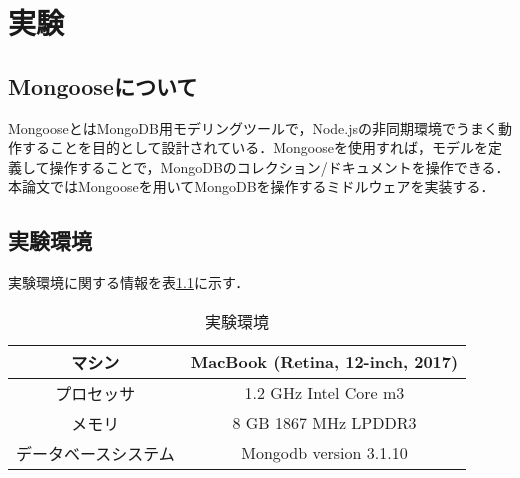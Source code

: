 \documentclass[a4paper,11pt]{ujreport}
\begin{document}
\chapter{実験}
\label{chap:Experiment}
\section{Mongooseについて}
MongooseとはMongoDB用モデリングツールで，Node.jsの非同期環境でうまく動作することを目的として設計されている．Mongooseを使用すれば，モデルを定義して操作することで，MongoDBのコレクション/ドキュメントを操作できる\cite{mongoose}．本論文ではMongooseを用いてMongoDBを操作するミドルウェアを実装する．

\section{実験環境}
実験環境に関する情報を表\ref{table:experiment_env}に示す．
\begin{table}[htb]
  \begin{center}
    \caption{実験環境}
		\label{table:experiment_env}
    \begin{tabular}{|c|c|} \hline
      マシン & MacBook (Retina, 12-inch, 2017) \\ \hline
      プロセッサ & 1.2 GHz Intel Core m3\\ \hline
      メモリ & 8 GB 1867 MHz LPDDR3\\ \hline
      データベースシステム & Mongodb version 3.1.10\\ \hline
    \end{tabular}
  \end{center}
\end{table}
\end{document}
